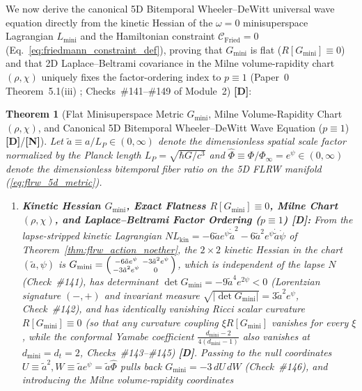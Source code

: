 \documentclass[11pt,a4paper]{article}
\newcommand{\catD}{\textbf{\textcolor{blue!75!black}{[D]}}}
\newcommand{\catN}{\textbf{\textcolor{teal!75!black}{[N]}}}
\newtheorem{theorem}{Theorem}[section]
\theoremstyle{definition}
\theoremstyle{remark}
\begin{document}
We now derive the canonical 5D Bitemporal Wheeler--DeWitt universal wave equation directly from the kinetic Hessian of the $\omega = 0$ minisuperspace Lagrangian $L_{\text{mini}}$ and the Hamiltonian constraint $\mathcal{C}_{\text{Fried}} = 0$ (Eq.~\ref{eq:friedmann_constraint_def}), proving that $G_{\text{mini}}$ is flat ($R[G_{\text{mini}}] \equiv 0$) and that 2D Laplace--Beltrami covariance in the Milne volume-rapidity chart $(\rho, \chi)$ uniquely fixes the factor-ordering index to $p \equiv 1$ (Paper~0 Theorem~5.1(iii) \cite{JV_Paper0}; Checks~\#141--\#149 of Module~2) \catD:

\begin{theorem}[Flat Minisuperspace Metric $G_{\text{mini}}$, Milne Volume-Rapidity Chart $(\rho, \chi)$, and Canonical 5D Bitemporal Wheeler--DeWitt Wave Equation ($p \equiv 1$) \catD/\catN]
\label{thm:wdw_and_hubble_shift}
Let $\tilde{a} \equiv a/L_P \in (0, \infty)$ denote the dimensionless spatial scale factor normalized by the Planck length $L_P = \sqrt{\hbar G/c^3}$ and $\hat{\Phi} \equiv \Phi/\Phi_{\infty} = e^{\psi} \in (0, \infty)$ denote the dimensionless bitemporal fiber ratio on the 5D FLRW manifold (\ref{eq:flrw_5d_metric}).
\begin{enumerate}
  \item[\textnormal{(i)}] \textbf{Kinetic Hessian $G_{\text{mini}}$, Exact Flatness $R[G_{\text{mini}}] \equiv 0$, Milne Chart $(\rho, \chi)$, and Laplace--Beltrami Factor Ordering ($p \equiv 1$) \catD:} From the lapse-stripped kinetic Lagrangian $N L_{\text{kin}} = -6\tilde{a}e^\psi\dot{\tilde{a}}^2 - 6\tilde{a}^2 e^\psi\dot{\tilde{a}}\dot{\psi}$ of Theorem~\ref{thm:flrw_action_noether}, the $2\times 2$ kinetic Hessian in the chart $(\tilde{a}, \psi)$ is $G_{\text{mini}} = \begin{psmallmatrix} -6\tilde{a}e^\psi & -3\tilde{a}^2 e^\psi \\ -3\tilde{a}^2 e^\psi & 0 \end{psmallmatrix}$, which is independent of the lapse $N$ (Check~\#141), has determinant $\det G_{\text{mini}} = -9\tilde{a}^4 e^{2\psi} < 0$ (Lorentzian signature $(-,+)$ and invariant measure $\sqrt{|\det G_{\text{mini}}|} = 3\tilde{a}^2 e^\psi$, Check~\#142), and has identically vanishing Ricci scalar curvature $R[G_{\text{mini}}] \equiv 0$ (so that any curvature coupling $\xi R[G_{\text{mini}}]$ vanishes for every $\xi$, while the conformal Yamabe coefficient $\frac{d_{\text{mini}}-2}{4(d_{\text{mini}}-1)}$ also vanishes at $d_{\text{mini}} = d_t = 2$, Checks~\#143--\#145) \catD. Passing to the null coordinates $U \equiv \tilde{a}^2, W \equiv \tilde{a}e^\psi = \tilde{a}\hat{\Phi}$ pulls back $G_{\text{mini}} = -3\,dU\,dW$ (Check~\#146), and introducing the Milne volume-rapidity coordinates

\end{enumerate}
\end{theorem}
\end{document}
